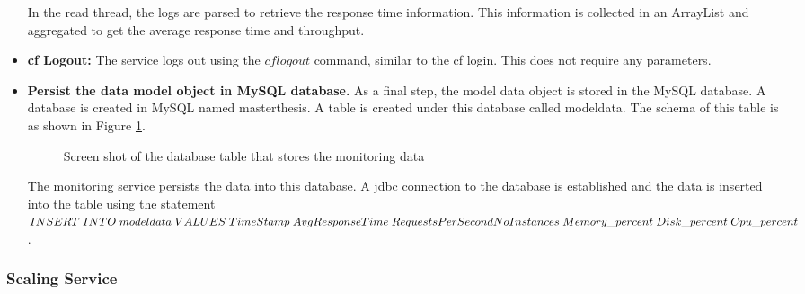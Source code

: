 \documentclass[article,type=msc,colorback,12pt,accentcolor=tud8b,table]{tudthesis}
\begin{document}
\begin{itemize}
In the read thread, the logs are parsed to retrieve the response time information. This information is collected in an ArrayList and aggregated to get the average response time and throughput. 
		
\item{\textbf{\gls{cf} Logout:}} The service logs out using the $cf logout$ command, similar to the cf login. This does not require any parameters.
		
\item{\textbf{Persist the data model object in MySQL database.}} As  a final step, the model data object is stored in the MySQL database. A database is created in MySQL named masterthesis. A table is created under this database called modeldata. The schema of this table is as shown in Figure \ref{fig:database_schema_screenshot}.

 \begin{figure}[h]
 	\begin{center}
 		\makebox[\textwidth]{\texttt{[image: D5]}}
 	\end{center}
 	\caption{Screen shot of the database table that stores the monitoring data}
 	\label{fig:database_schema_screenshot}
 \end{figure}	

The monitoring service persists the data into this database. A \gls{jdbc} connection to the database is established and the data is inserted into the table using the statement $INSERT\; INTO \;modeldata \;VALUES \;TimeStamp \;AvgResponseTime \;RequestsPerSecond \\ 
NoInstances \;Memory\_percent\; Disk\_percent \; Cpu\_percent$.

		
\end{itemize}	
\subsubsection{Scaling Service}
	
\end{document}
